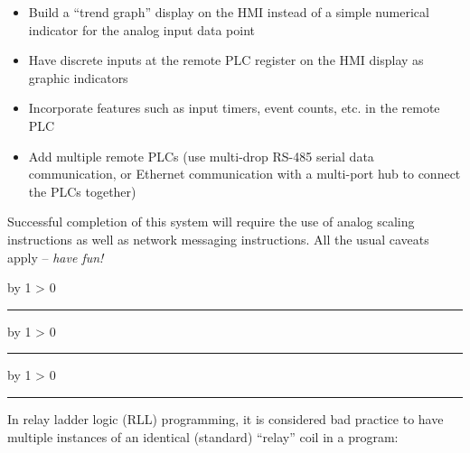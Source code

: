 \documentclass[12pt,a4paper]{article}
\def\oppgave{
            \advance\questnum by 1
            \ifnum \questnum > 0
                 \hrule
                 \vskip 3pt
                 \leftline{Oppgave \the\questnum}
                 \vskip 3pt \fi}
\def\svar{
           \advance\answnum by 1
           \ifnum \answnum > 0
                \hrule
                \vskip 3pt
                \leftline{Svar \the\answnum}
                \vskip 3pt \fi}
\def\notes{
           \advance\explnum by 1
           \ifnum \explnum > 0
                \hrule
                \vskip 3pt
                \leftline{Notes \the\explnum}
                \vskip 3pt \fi}
\begin{document}
\begin{itemize}
\item{} Build a ``trend graph'' display on the HMI instead of a simple numerical indicator for the analog input data point
\vskip 5pt
\item{} Have discrete inputs at the remote PLC register on the HMI display as graphic indicators
\vskip 5pt
\item{} Incorporate features such as input timers, event counts, etc. in the remote PLC
\vskip 5pt
\item{} Add multiple remote PLCs (use multi-drop RS-485 serial data communication, or Ethernet communication with a multi-port hub to connect the PLCs together)
\end{itemize}

\vskip 10pt

Successful completion of this system will require the use of analog scaling instructions as well as network messaging instructions.  All the usual caveats apply -- {\it have fun!}

\vfil 

\eject
\vskip 10pt \filbreak 





\svar{} 

 
\vskip 10pt \filbreak 





\notes{} 



\vfil \eject 



\oppgave{} 

In relay ladder logic (RLL) programming, it is considered bad practice to have multiple instances of an identical (standard) ``relay'' coil in a program:
\end{document}
